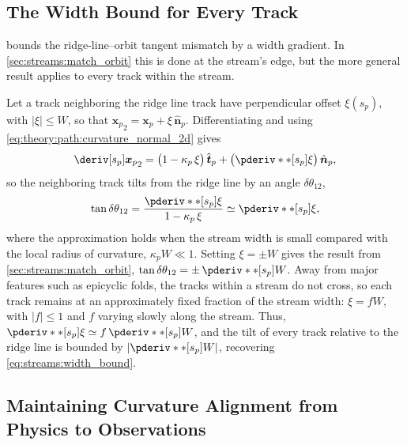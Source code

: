 \documentclass[linenumbers,twocolumn]{aastex701}
\renewcommand{\mbf}[1]{\boldsymbol{#1}}
\newcommand{\xvec}{\mbf{x}}  %
\newcommand{\that}{\hat{\mbf{t}}}  %
\newcommand{\nhat}{\hat{\mbf{n}}}  %
\newcommand{\sarc}{s}  %
\newcommand{\curvature}{\kappa}  %
\newcommand{\proj}[1]{{#1}_{p}}  %
\newcommand{\xsky}{\proj{\xvec}}  %
\newcommand{\tphat}{\proj{\that}}  %
\newcommand{\nphat}{\proj{\nhat}}  %
\newcommand{\ssky}{\proj{\sarc}} %
\newcommand{\curvaturesky}{\proj{\curvature}}  %
\begin{document}
    \subsection{The Width Bound for Every Track}\label{sec:ridgeline_robustness:width_bound}

         bounds the ridge-line--orbit tangent mismatch by a width gradient. %
        In \autoref{sec:streams:match_orbit} this is done at the stream's edge, but the more general result applies to every track within the stream. %

        Let a track neighboring the ridge line track have perpendicular offset $\xi(\ssky)$, with $|\xi|\le W$, so that ${\xsky}_2 = \xsky + \xi\,\nphat$. %
        Differentiating and using \cref{eq:theory:path:curvature_normal_2d} gives %
        \begin{equation}\label{eq:streams:neighbor_tangent}
            \deriv[\ssky]{{\xsky}_2}
            = \bigl(1-\curvaturesky\,\xi\bigr)\,\tphat
            + \bigl(\pderiv**[\ssky]{\xi}\bigr)\,\nphat , %
        \end{equation}
        so the neighboring track tilts from the ridge line by an angle $\delta\theta_{12}$, %
        \begin{equation}\label{eq:streams:neighbor_angle}
            \tan\delta\theta_{12}
            = \frac{\pderiv**[\ssky]{\xi}}{1-\curvaturesky\,\xi}
            \simeq \pderiv**[\ssky]{\xi} , %
        \end{equation}
        where the approximation holds when the stream width is small compared with the local radius of curvature, $\curvaturesky W \ll 1$. %
        Setting $\xi = \pm W$ gives the result from \autoref{sec:streams:match_orbit}, $\tan\delta\theta_{12} = \pm\,\pderiv**[\ssky]{W}$. %
        Away from major features such as epicyclic folds, the tracks within a stream do not cross, so each track remains at an approximately fixed fraction of the stream width: $\xi = fW$, with $|f| \le 1$ and $f$ varying slowly along the stream. %
        Thus, $\pderiv**[\ssky]{\xi} \simeq f\,\pderiv**[\ssky]{W}$, and the tilt of every track relative to the ridge line is bounded by $|\pderiv**[\ssky]{W}|$, recovering \cref{eq:streams:width_bound}. %


    \subsection{Maintaining Curvature Alignment from Physics to Observations}\label{sec:ridgeline_robustness:smoothing}
\end{document}
